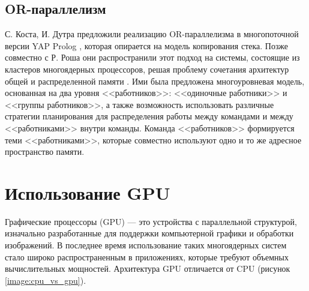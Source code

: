 \subsection{OR-параллелизм}
С. Коста, И. Дутра предложили реализацию OR-параллелизма в многопоточной версии YAP Prolog \cite{costa}, которая опирается на модель копирования стека. Позже совместно с Р. Роша они распространили этот подход на системы, состоящие из кластеров многоядерных процессоров, решая проблему сочетания архитектур общей и распределенной памяти \cite{rosha}. Ими была предложена многоуровневая модель, основанная на два уровня <<работников>>: <<одиночные работники>> и <<группы работников>>, а также возможность использовать различные стратегии планирования для распределения работы между командами и между <<работниками>> внутри команды. Команда <<работников>> формируется теми <<работниками>>, которые совместно используют одно и то же адресное пространство памяти.
 
\section{Использование GPU}
Графические процессоры (GPU) --- это устройства с параллельной структурой, изначально разработанные для поддержки компьютерной графики и обработки изображений. В последнее время использование таких многоядерных систем стало широко распространенным в приложениях, которые требуют объемных вычислительных мощностей. Архитектура GPU отличается от CPU (рисунок \ref{image:cpu_vs_gpu}).

